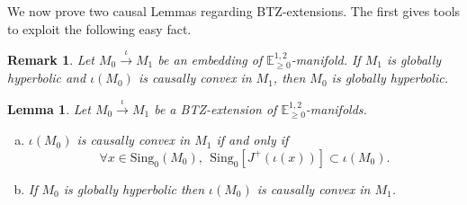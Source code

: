 \documentclass[a4paper,12pt]{article}
\def\sing{\mathrm{Sing}}
\newcommand{\mass}[1]{{\mathbb E}^{1,2}_{#1}}
\newtheorem{lemou}{Lemma}[section]          %
\newtheorem{remark}{Remark}             %
\begin{document}
We now prove two causal Lemmas regarding BTZ-extensions. The first gives tools to exploit the following easy fact.
		\begin{remark}  Let $M_0 \xrightarrow{\iota} M_1$ be an embedding of $\mass{\geq0}$-manifold.
		 If $M_1$ is globally hyperbolic and $\iota(M_0)$ is causally convex in $M_1$, then $M_0$ is globally hyperbolic.
		\end{remark}

		
\begin{lemou}\label{lem:BTZext_caus_conv}
	Let $M_0\xrightarrow{\iota} M_1$ be a BTZ-extension of $\mass{\geq0}$-manifolds. 
	\begin{enumerate}[(a)]
	\item $\iota(M_0)$ is causally convex in $M_1$ if and only if  $$\forall x\in \sing_0(M_0), ~~\sing_0\left[J^+(\iota(x))\right] \subset \iota(M_0).$$ 
	\item If $M_0$ is globally hyperbolic then $\iota(M_0)$ is causally convex in $M_1$.
	
	\end{enumerate}
\end{lemou}
\end{document}
